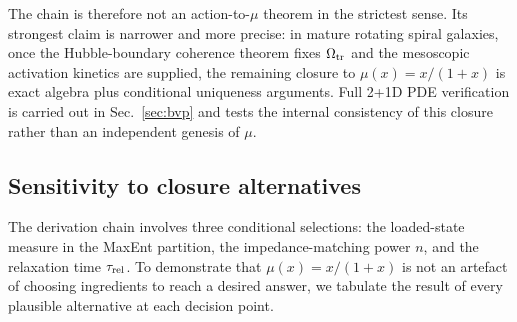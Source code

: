 \documentclass[11pt]{article}
\begin{document}
\medskip\noindent
The chain is therefore not an action-to-$\mu$ theorem in the
strictest sense.  Its strongest claim is narrower and more precise:
in mature rotating spiral galaxies, once the Hubble-boundary
coherence theorem fixes $\Omega_{\rm tr}$ and the mesoscopic activation
kinetics are supplied, the remaining
closure to $\mu(x)=x/(1+x)$ is exact algebra plus conditional
uniqueness arguments.  Full 2+1D PDE verification is carried out in
Sec.~\ref{sec:bvp} and tests the internal consistency of this closure
rather than an independent genesis of $\mu$.

\subsection{Sensitivity to closure alternatives}\label{sec:closure_alternatives}

The derivation chain involves three conditional selections: the
loaded-state measure in the MaxEnt partition, the impedance-matching
power $n$, and the relaxation time $\tau_{\rm rel}$.  To demonstrate
that $\mu(x)=x/(1+x)$ is not an artefact of choosing ingredients to
reach a desired answer, we tabulate the result of every plausible
alternative at each decision point.
\end{document}

